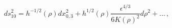 \begin{equation}
\label{metricks}
ds_{10}^2=h^{-1/2}(\rho) dx_{0,3}^2 + h^{1/2}(\rho) \frac{\epsilon^{4/3}}{6 K(\rho)^2} d\rho^2
+\ldots\,,
\end{equation}

